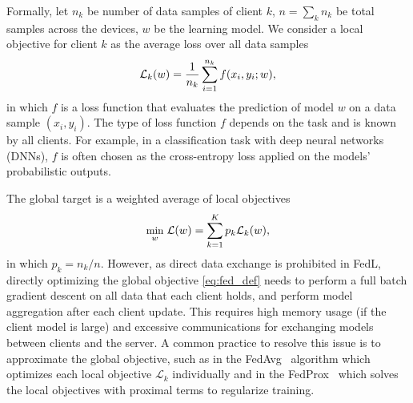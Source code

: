 Formally, let 
$n_k$ be number of data samples of client $k$, $n=\sum_k n_k$ be total samples across the devices, $w$ be the learning model.
We consider a local objective for client $k$ as the average loss over all data samples
\begin{equation}
\small
\mathcal{L}_k(w)=\frac{1}{n_k} \sum_{i=1}^{n_k} f(x_i,y_i;w),
\label{eq:fed_loss}
\end{equation}
in which $f$ is a loss function that evaluates the prediction of model $w$ on a data sample $(x_i, y_i)$. 
The type of loss function $f$ depends on the task and is known by all clients.
For example, in a classification task with deep neural networks (DNNs), $f$ is often chosen as the cross-entropy loss applied on the models' probabilistic outputs.

The global target is a weighted average of local objectives
\begin{equation}
\small
\underset{w}{\text{min}} \ \mathcal{L}(w) = \sum_{k=1}^{K} p_k \mathcal{L}_k(w),
\label{eq:fed_def}
\end{equation}
in which $p_k = n_k/n$. 
However, as direct data exchange is prohibited in FedL, directly optimizing the global objective  \eqref{eq:fed_def} needs to perform a 
full batch gradient descent on all data that each client holds, and perform 
model aggregation after each client update. This requires high memory usage (if the client model is large) and excessive communications for exchanging models between clients and the server.
A common practice to resolve this issue is to approximate the global objective, such as in the
FedAvg~\cite{fedavg} algorithm which optimizes each local objective $\mathcal{L}_k$ individually and in the FedProx~\cite{li2018federated} which solves the local objectives with proximal terms to regularize training.


